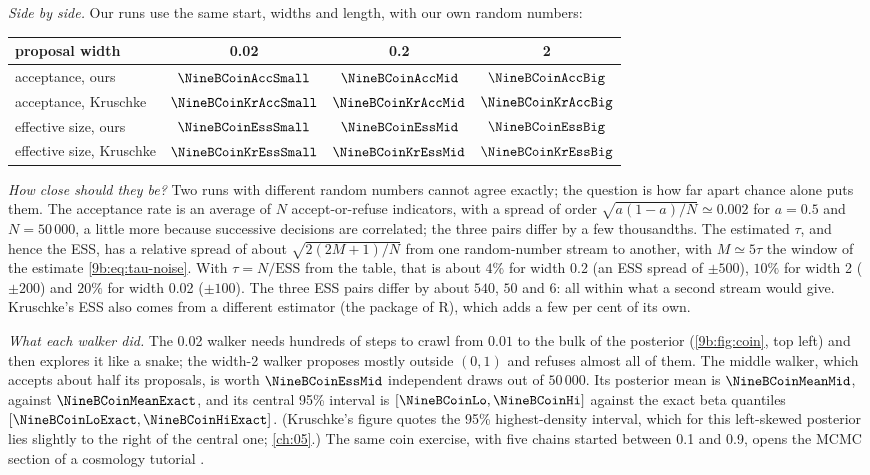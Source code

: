 \emph{Side by side.} Our runs use the same start, widths and length, with our own random numbers:
\begin{center}
\begin{tabular}{lccc}
\toprule
proposal width & 0.02 & 0.2 & 2 \\
\midrule
acceptance, ours & $\NineBCoinAccSmall$ & $\NineBCoinAccMid$ & $\NineBCoinAccBig$ \\
acceptance, Kruschke & $\NineBCoinKrAccSmall$ & $\NineBCoinKrAccMid$ & $\NineBCoinKrAccBig$ \\
effective size, ours & $\NineBCoinEssSmall$ & $\NineBCoinEssMid$ & $\NineBCoinEssBig$ \\
effective size, Kruschke & $\NineBCoinKrEssSmall$ & $\NineBCoinKrEssMid$ & $\NineBCoinKrEssBig$ \\
\bottomrule
\end{tabular}
\end{center}

\emph{How close should they be?} Two runs with different random numbers cannot agree exactly; the
question is how far apart chance alone puts them. The acceptance rate is an average of $N$
accept-or-refuse indicators, with a spread of order $\sqrt{a(1-a)/N}\simeq0.002$ for $a=0.5$ and
$N=50\,000$, a little more because successive decisions are correlated; the three pairs differ by
a few thousandths. The estimated $\tau$, and hence the ESS, has a relative spread of about
$\sqrt{2(2M+1)/N}$ from one random-number stream to another, with $M\simeq5\tau$ the window of
the estimate \eqref{9b:eq:tau-noise}. With $\tau=N/\mathrm{ESS}$ from the table, that is about
$4\%$ for width 0.2 (an ESS spread of $\pm500$), $10\%$ for width 2 ($\pm200$) and $20\%$ for width
0.02 ($\pm100$). The three ESS pairs differ by about $540$, $50$ and $6$: all within what a second
stream would give. Kruschke's ESS also comes from a different
estimator (the  package of R), which adds a few per cent of its own.

\emph{What each walker did.} The 0.02 walker needs hundreds of steps to crawl from $0.01$ to the
bulk of the posterior (\cref{9b:fig:coin}, top left) and then explores it like a snake; the
width-2 walker proposes mostly outside $(0,1)$ and refuses almost all of them. The middle walker,
which accepts about half its proposals, is worth $\NineBCoinEssMid$ independent draws out of
$50\,000$. Its posterior mean is $\NineBCoinMeanMid$, against $\NineBCoinMeanExact$, and its
central 95\% interval is $[\NineBCoinLo,\NineBCoinHi]$ against the exact beta quantiles
$[\NineBCoinLoExact,\NineBCoinHiExact]$. (Kruschke's figure quotes the 95\% highest-density
interval, which for this left-skewed posterior lies slightly to the right of the central one;
\cref{ch:05}.) The same coin exercise, with five chains started between 0.1 and 0.9, opens the
MCMC section of a cosmology tutorial .

